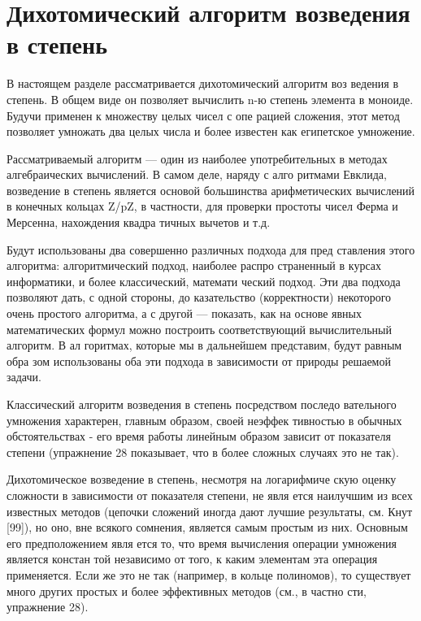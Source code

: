 \pagebreak
\section{Дихотомический алгоритм возведения в степень}
\noindent В настоящем разделе рассматривается дихотомический алгоритм воз­
ведения в степень. В общем виде он позволяет вычислить n-ю степень 
элемента в моноиде. Будучи применен к множеству целых чисел с опе­
рацией сложения, этот метод позволяет умножать два целых  числа и 
более известен как египетское умножение.

\parindent=1cm Рассматриваемый алгоритм — один из наиболее употребительных 
в  методах алгебраических вычислений.  В  самом деле,  наряду с  алго­
ритмами Евклида, возведение в степень является основой большинства 
арифметических  вычислений  в  конечных кольцах Z/pZ, в частности, 
для проверки простоты чисел Ферма и Мерсенна, нахождения квадра­
тичных вычетов и т.д.

Будут использованы два совершенно различных подхода для пред­
ставления этого алгоритма: алгоритмический подход, наиболее распро­
страненный  в курсах информатики,  и более классический,  математи­
ческий подход. Эти два подхода позволяют дать, с одной стороны, до­
казательство (корректности)  некоторого очень простого алгоритма, а 
с  другой  —  показать,  как  на основе явных математических  формул 
можно построить соответствующий вычислительный алгоритм. В ал­
горитмах, которые мы в дальнейшем представим, будут равным обра­
зом использованы оба эти подхода в зависимости от природы решаемой 
задачи.

\parindent=1cm Классический алгоритм возведения в степень посредством последо­
вательного умножения характерен,  главным образом, своей  неэффек­
тивностью в обычных обстоятельствах - его время работы линейным 
образом зависит  от  показателя  степени  (упражнение  28  показывает, 
что в более сложных случаях это не так).

\parindent=1cm Дихотомическое  возведение  в степень,  несмотря  на логарифмиче­
скую оценку сложности в зависимости от показателя степени, не явля­
ется наилучшим из всех известных методов (цепочки сложений иногда 
дают лучшие результаты, см. Кнут [99]), но оно, вне всякого сомнения, 
является самым простым из них. Основным его предположением явля­
ется то, что время вычисления операции умножения является констан­
той независимо от того, к каким элементам эта операция применяется. 
Если  же  это  не  так  (например,  в  кольце  полиномов),  то  существует 
много других простых и более эффективных  методов (см.,  в частно­
сти, упражнение 28).
